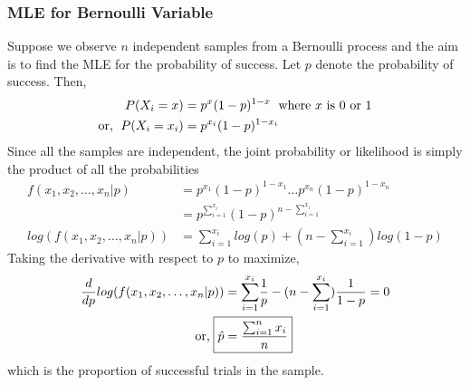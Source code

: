\documentclass[../probability-notes.tex]{subfiles}
\begin{document}
    \subsubsection{MLE for Bernoulli Variable}
    Suppose we observe $n$ independent samples from a Bernoulli process and the aim is to find the MLE for the probability of success.\newline
    Let $p$ denote the probability of success. Then,
    \begin{align*}
        P(X_{i} = x) &= p^{x}(1-p)^{1-x} \text{\; where $x$ is $0$ or $1$}\\
        \text{or, \;} P(X_{i} = x_{i}) &= p^{x_{i}}(1-p)^{1-x_{i}}
    \end{align*}
    Since all the samples are independent, the joint probability or likelihood is simply the product of all the probabilities
    \begin{align*}
        f(x_{1}, x_{2}, \ldots, x_{n}|p) &= p^{x_{1}}(1-p)^{1-x_{1}} \ldots p^{x_{n}}(1-p)^{1-x_{n}}\\
        &= p^{\sum_{i=1}^{x_{i}}} (1-p)^{n-\sum_{i=1}^{x_{i}}}\\
        log(f(x_{1}, x_{2}, \ldots, x_{n}|p)) &= {\sum_{i=1}^{x_{i}}}log(p) + (n-{\sum_{i=1}^{x_{i}}})log(1-p)
    \end{align*}
    Taking the derivative with respect to $p$ to maximize,
    \begin{align*}
        \frac{d}{dp}log(f(x_{1}, x_{2}, \ldots, x_{n}|p)) &= {\sum_{i=1}^{x_{i}}}\frac{1}{p} - (n-{\sum_{i=1}^{x_{i}}})\frac{1}{1-p} = 0\\
        \text{or,\;} \Aboxed{\hat{p} &= \frac{\sum_{i=1}^{n}x_{i}}{n}}
    \end{align*}
    which is the proportion of successful trials in the sample.


\end{document}
